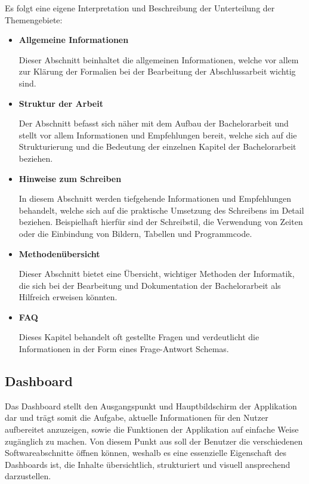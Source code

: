 \documentclass{scrreprt}
\begin{document}
\par Es folgt eine eigene Interpretation und Beschreibung der Unterteilung der Themengebiete:

\begin{itemize}
\item \textbf{Allgemeine Informationen}
\par Dieser Abschnitt beinhaltet die allgemeinen Informationen, welche vor allem zur Klärung der Formalien bei der Bearbeitung der Abschlussarbeit wichtig sind.

\item \textbf{Struktur der Arbeit}
\par Der Abschnitt befasst sich näher mit dem Aufbau der Bachelorarbeit und stellt vor allem Informationen und Empfehlungen bereit, welche sich auf die Strukturierung und die Bedeutung der einzelnen Kapitel der Bachelorarbeit beziehen. 

\item \textbf{Hinweise zum Schreiben}
\par In diesem Abschnitt werden tiefgehende Informationen und Empfehlungen behandelt, welche sich auf die praktische Umsetzung des Schreibens im Detail beziehen. Beispielhaft hierfür sind der Schreibstil, die Verwendung von Zeiten oder die Einbindung von Bildern, Tabellen und Programmcode.

\item \textbf{Methodenübersicht}
\par Dieser Abschnitt bietet eine Übersicht, wichtiger Methoden der Informatik, die sich bei der Bearbeitung und Dokumentation der Bachelorarbeit als Hilfreich erweisen könnten.

\item \textbf{FAQ}
\par Dieses Kapitel behandelt oft gestellte Fragen und verdeutlicht die Informationen in der Form eines Frage-Antwort Schemas.
\end{itemize}

\subsection{Dashboard}
\par Das Dashboard stellt den Ausgangspunkt und Hauptbildschirm der Applikation dar und trägt somit die Aufgabe, aktuelle Informationen für den Nutzer aufbereitet anzuzeigen, sowie die Funktionen der Applikation auf einfache Weise zugänglich zu machen. Von diesem Punkt aus soll der Benutzer die verschiedenen Softwareabschnitte öffnen können, weshalb es eine essenzielle Eigenschaft des Dashboards ist, die Inhalte übersichtlich, strukturiert und visuell ansprechend darzustellen.\\
\end{document}
